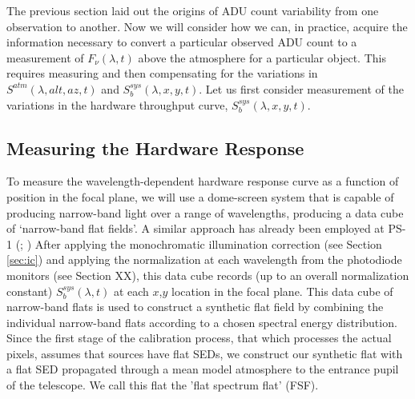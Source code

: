 \documentclass[12pt,preprint]{aastex}
\begin{document}
The previous section laid out the origins of ADU count variability
from one observation to another. Now we will consider how we can, in
practice, acquire the information necessary to convert a particular
observed ADU count to a measurement of $F_\nu(\lambda,t)$ above the
atmosphere for a particular object.  This requires measuring and then 
compensating for the variations in
$S^{atm}(\lambda,alt,az,t)$ and $S_b^{sys}(\lambda,x,y,t)$.
Let us first consider measurement of the variations in the hardware
throughput curve, $S_b^{sys}(\lambda,x,y,t)$. 



\subsection{Measuring the Hardware Response}
To measure the wavelength-dependent hardware response
curve as a function of position in the focal plane, we will use a
dome-screen system that is capable of producing narrow-band light 
over a range of wavelengths, producing a data cube of `narrow-band flat
fields'.  A similar approach has already been employed at PS-1 (\citep{StubbsTonry2012}; \citep{Tonry2012})
After applying the monochromatic illumination correction 
(see Section \ref{sec:ic}) and applying the normalization at each wavelength from
the photodiode monitors (see Section XX),  this data cube
records (up to an overall normalization constant) $S_b^{sys}(\lambda,t)$ at each $x$,$y$ location in the focal plane. 
This data cube of narrow-band
flats is used to construct a synthetic flat field by
combining the individual narrow-band flats according to a chosen
spectral energy distribution.  Since the first stage of the calibration process, that which
processes the actual pixels, assumes that sources have flat SEDs, we construct our synthetic flat
with a flat SED propagated through a mean model atmosphere to the entrance pupil of the
telescope.  We call this flat the 'flat spectrum flat' (FSF).
\end{document}
